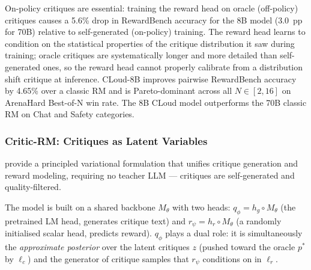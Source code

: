 On-policy critiques are essential: training the reward head on oracle (off-policy) critiques causes a 5.6\% drop in RewardBench accuracy for the 8B model (3.0~pp for 70B) relative to self-generated (on-policy) training. The reward head learns to condition on the statistical properties of the critique distribution it saw during training; oracle critiques are systematically longer and more detailed than self-generated ones, so the reward head cannot properly calibrate from a distribution shift critique at inference. CLoud-8B improves pairwise RewardBench accuracy by 4.65\% over a classic RM and is Pareto-dominant across all $N \in [2,16]$ on ArenaHard Best-of-N win rate. The 8B CLoud model outperforms the 70B classic RM on Chat and Safety categories.

\subsubsection{Critic-RM: Critiques as Latent Variables}
\label{sec:critic-rm}

\autocite{yu2025selfgeneratedcritiquesboostreward} provide a principled variational formulation that unifies critique generation and reward modeling, requiring no teacher LLM --- critiques are self-generated and quality-filtered.

The model is built on a shared backbone $M_\theta$ with two heads: $q_\phi = h_g \circ M_\theta$ (the pretrained LM head, generates critique text) and $r_\psi = h_r \circ M_\theta$ (a randomly initialised scalar head, predicts reward). $q_\phi$ plays a dual role: it is simultaneously the \emph{approximate posterior} over the latent critiques $z$ (pushed toward the oracle $p^*$ by $\ell_c$) and the generator of critique samples that $r_\psi$ conditions on in $\ell_r$.

